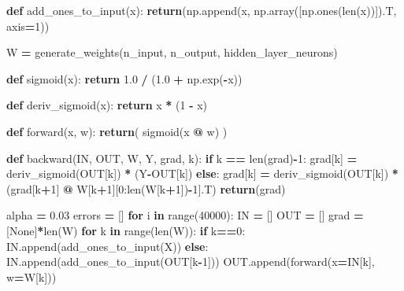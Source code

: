 \documentclass[
]{book}
\newenvironment{Shaded}{\begin{snugshade}}{\end{snugshade}}
\newcommand{\BuiltInTok}[1]{#1}
\newcommand{\ControlFlowTok}[1]{\textcolor[rgb]{0.13,0.29,0.53}{\textbf{#1}}}
\newcommand{\DecValTok}[1]{\textcolor[rgb]{0.00,0.00,0.81}{#1}}
\newcommand{\FloatTok}[1]{\textcolor[rgb]{0.00,0.00,0.81}{#1}}
\newcommand{\KeywordTok}[1]{\textcolor[rgb]{0.13,0.29,0.53}{\textbf{#1}}}
\newcommand{\NormalTok}[1]{#1}
\newcommand{\OperatorTok}[1]{\textcolor[rgb]{0.81,0.36,0.00}{\textbf{#1}}}
\newcommand{\VariableTok}[1]{\textcolor[rgb]{0.00,0.00,0.00}{#1}}
\begin{document}
\begin{Shaded}
\begin{Highlighting}[]
\KeywordTok{def}\NormalTok{ add\_ones\_to\_input(x):}
  \ControlFlowTok{return}\NormalTok{(np.append(x, np.array([np.ones(}\BuiltInTok{len}\NormalTok{(x))]).T, axis}\OperatorTok{=}\DecValTok{1}\NormalTok{))}


\NormalTok{W }\OperatorTok{=}\NormalTok{ generate\_weights(n\_input, n\_output, hidden\_layer\_neurons)}


\KeywordTok{def}\NormalTok{ sigmoid(x):}
  \ControlFlowTok{return} \FloatTok{1.0} \OperatorTok{/}\NormalTok{ (}\FloatTok{1.0} \OperatorTok{+}\NormalTok{ np.exp(}\OperatorTok{{-}}\NormalTok{x))}

\KeywordTok{def}\NormalTok{ deriv\_sigmoid(x):}
  \ControlFlowTok{return}\NormalTok{ x }\OperatorTok{*}\NormalTok{ (}\DecValTok{1} \OperatorTok{{-}}\NormalTok{ x)}


\KeywordTok{def}\NormalTok{ forward(x, w):}
  \ControlFlowTok{return}\NormalTok{( sigmoid(x }\OperatorTok{@}\NormalTok{ w) )}

\KeywordTok{def}\NormalTok{ backward(IN, OUT, W, Y, grad, k):}
  \ControlFlowTok{if}\NormalTok{ k }\OperatorTok{==} \BuiltInTok{len}\NormalTok{(grad)}\OperatorTok{{-}}\DecValTok{1}\NormalTok{:}
\NormalTok{    grad[k] }\OperatorTok{=}\NormalTok{ deriv\_sigmoid(OUT[k]) }\OperatorTok{*}\NormalTok{ (Y}\OperatorTok{{-}}\NormalTok{OUT[k])}
  \ControlFlowTok{else}\NormalTok{:}
\NormalTok{    grad[k] }\OperatorTok{=}\NormalTok{ deriv\_sigmoid(OUT[k]) }\OperatorTok{*}\NormalTok{(grad[k}\OperatorTok{+}\DecValTok{1}\NormalTok{] }\OperatorTok{@}\NormalTok{ W[k}\OperatorTok{+}\DecValTok{1}\NormalTok{][}\DecValTok{0}\NormalTok{:}\BuiltInTok{len}\NormalTok{(W[k}\OperatorTok{+}\DecValTok{1}\NormalTok{])}\OperatorTok{{-}}\DecValTok{1}\NormalTok{].T)}
  \ControlFlowTok{return}\NormalTok{(grad)}

\NormalTok{alpha }\OperatorTok{=} \FloatTok{0.03}
\NormalTok{errors }\OperatorTok{=}\NormalTok{ []}
\ControlFlowTok{for}\NormalTok{ i }\KeywordTok{in} \BuiltInTok{range}\NormalTok{(}\DecValTok{40000}\NormalTok{):}
\NormalTok{  IN }\OperatorTok{=}\NormalTok{ []}
\NormalTok{  OUT }\OperatorTok{=}\NormalTok{ []}
\NormalTok{  grad }\OperatorTok{=}\NormalTok{ [}\VariableTok{None}\NormalTok{]}\OperatorTok{*}\BuiltInTok{len}\NormalTok{(W)}
  \ControlFlowTok{for}\NormalTok{ k }\KeywordTok{in} \BuiltInTok{range}\NormalTok{(}\BuiltInTok{len}\NormalTok{(W)):}
    \ControlFlowTok{if}\NormalTok{ k}\OperatorTok{==}\DecValTok{0}\NormalTok{:}
\NormalTok{      IN.append(add\_ones\_to\_input(X))}
    \ControlFlowTok{else}\NormalTok{:}
\NormalTok{      IN.append(add\_ones\_to\_input(OUT[k}\OperatorTok{{-}}\DecValTok{1}\NormalTok{]))}
\NormalTok{    OUT.append(forward(x}\OperatorTok{=}\NormalTok{IN[k], w}\OperatorTok{=}\NormalTok{W[k]))}
    

\end{Highlighting}
\end{Shaded}
\end{document}
